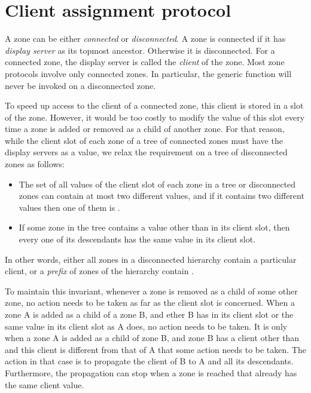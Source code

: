 



\section{Client assignment protocol}

A zone can be either \emph{connected} or \emph{disconnected}.  A zone
is connected if it has \emph{display server} as its topmost ancestor.
Otherwise it is disconnected.  For a connected zone, the display
server is called the \emph{client} of the zone.  Most zone protocols
involve only connected zones.  In particular, the generic function
 will never be invoked on a disconnected zone.

To speed up access to the client of a connected zone, this client is
stored in a slot of the zone.  However, it would be too costly to
modify the value of this slot every time a zone is added or removed as
a child of another zone.  For that reason, while the client slot of
each zone of a tree of connected zones must have the display servers
as a value, we relax the requirement on a tree of disconnected zones
as follows:

\begin{itemize}
\item The set of all values of the client slot of each zone in a tree
  or disconnected zones can contain at most two different values, and
  if it contains two different values then one of them is .
\item If some zone in the tree contains a value other than 
  in its client slot, then every one of its descendants has the same
  value in its client slot.  
\end{itemize}

In other words, either all zones in a disconnected hierarchy contain a
particular client, or a \emph{prefix} of zones of the hierarchy
contain .

To maintain this invariant, whenever a zone is removed as a child of
some other zone, no action needs to be taken as far as the client slot
is concerned.  When a zone A is added as a child of a zone B, and
ether B has  in its client slot or the same value in its
client slot as A does, no action needs to be taken.  It is only when a
zone A is added as a child of zone B, and zone B has a client other
than  and this client is different from that of A that some
action needs to be taken.  The action in that case is to propagate the
client of B to A and all its descendants.  Furthermore, the
propagation can stop when a zone is reached that already has the same
client value. 

